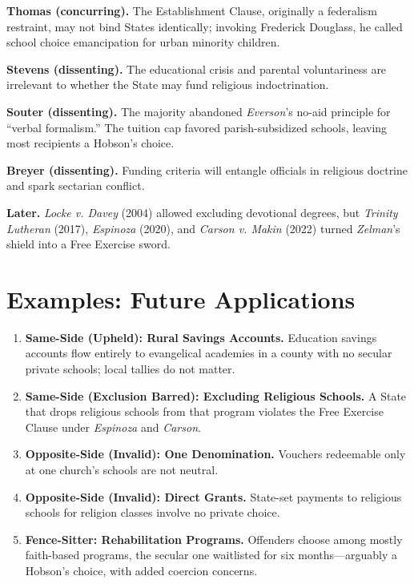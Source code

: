 \documentclass[12pt]{article}
\begin{document}
\textbf{Thomas (concurring).} The Establishment Clause, originally a federalism restraint, may not bind States identically; invoking Frederick Douglass, he called school choice emancipation for urban minority children.

\textbf{Stevens (dissenting).} The educational crisis and parental voluntariness are irrelevant to whether the State may fund religious indoctrination.

\textbf{Souter (dissenting).} The majority abandoned \textit{Everson}'s no-aid principle for ``verbal formalism.'' The tuition cap favored parish-subsidized schools, leaving most recipients a Hobson's choice.

\textbf{Breyer (dissenting).} Funding criteria will entangle officials in religious doctrine and spark sectarian conflict.

\textbf{Later.} \textit{Locke v. Davey} (2004) allowed excluding devotional degrees, but \textit{Trinity Lutheran} (2017), \textit{Espinoza} (2020), and \textit{Carson v. Makin} (2022) turned \textit{Zelman}'s shield into a Free Exercise sword.

\section{Examples: Future Applications}

\begin{enumerate}
\item \textbf{Same-Side (Upheld): Rural Savings Accounts.} Education savings accounts flow entirely to evangelical academies in a county with no secular private schools; local tallies do not matter.
\item \textbf{Same-Side (Exclusion Barred): Excluding Religious Schools.} A State that drops religious schools from that program violates the Free Exercise Clause under \textit{Espinoza} and \textit{Carson}.
\item \textbf{Opposite-Side (Invalid): One Denomination.} Vouchers redeemable only at one church's schools are not neutral.
\item \textbf{Opposite-Side (Invalid): Direct Grants.} State-set payments to religious schools for religion classes involve no private choice.
\item \textbf{Fence-Sitter: Rehabilitation Programs.} Offenders choose among mostly faith-based programs, the secular one waitlisted for six months---arguably a Hobson's choice, with added coercion concerns.
\end{enumerate}
\end{document}
